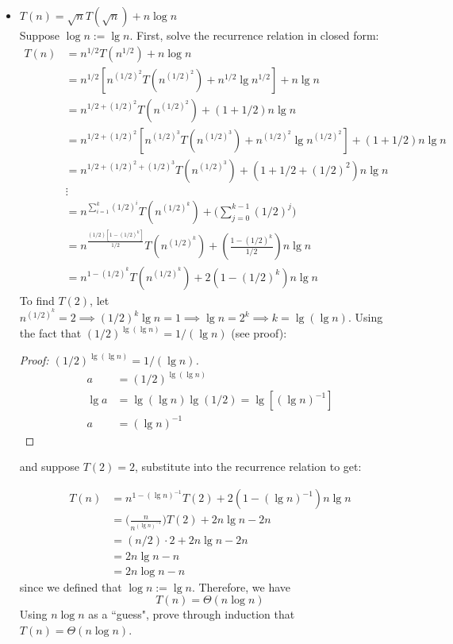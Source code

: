 \documentclass{article}
\begin{document}
\begin{itemize}
	\item $T(n)=\sqrt{n}T(\sqrt{n})+n\log n$ \\
	Suppose $\log n := \lg n$. First, solve the recurrence relation in closed form:
	\begin{align*}
	T(n)&=n^{1/2}T(n^{1/2})+n\log n \\
	&=n^{1/2}[n^{(1/2)^2}T(n^{(1/2)^2})+n^{1/2}\lg n^{1/2}] + n\lg n \\
	&=n^{1/2 + (1/2)^2}T(n^{(1/2)^2})+(1+1/2)n\lg n\\
	&=n^{1/2 + (1/2)^2} [n^{(1/2)^3}T(n^{(1/2)^3})+n^{(1/2)^2}\lg n^{(1/2)^2}]   +(1+1/2)n\lg n\\
	&=n^{1/2+(1/2)^2+(1/2)^3}T(n^{(1/2)^3})+(1+1/2+(1/2)^2)n\lg n \\
	&\vdots \\
	&=n^{\sum_{i=1}^{k}(1/2)^i}T(n^{(1/2)^k}) + \Big(\sum_{j=0}^{k-1} (1/2)^j\Big)\\
	&=n^\frac{(1/2)[1-(1/2)^k]}{1/2}T(n^{(1/2)^k})+(\frac{1-(1/2)^k}{1/2})n\lg n \\
	&=n^{1-(1/2)^k}T(n^{(1/2)^k})+2(1-(1/2)^k)n\lg n
	\end{align*}
	To find $T(2)$, let $n^{(1/2)^k}=2 \implies (1/2)^k \lg n = 1 \implies \lg n = 2^k \implies k = \lg(\lg n)$. Using the fact that $(1/2)^{\lg(\lg n)} = 1/(\lg n)$ (see proof):
	\begin{mdframed}
	\begin{proof}[Proof: $(1/2)^{\lg(\lg n)} = 1/(\lg n)$]
	\begin{align*}
	a &= (1/2)^{\lg(\lg n)} \\
	\lg a &= \lg (\lg n) \lg (1/2) = \lg [(\lg n)^{-1}]\\
	a &= (\lg n)^{-1}
	\end{align*}
	\end{proof}
	\end{mdframed}
	
	and suppose $T(2)=2$, substitute into the recurrence relation to get:
	
	\begin{align*}
	T(n) &= n^{1-(\lg n)^{-1}}T(2) + 2(1-(\lg n)^{-1})n \lg n \\
	& = \Big(\frac{n}{n^{(\lg n)^{-1}}}\Big)T(2)+2n\lg n - 2n \\
	& = (n/2)\cdot 2 + 2n \lg n-2n \\
	&= 2n\lg n - n \\
	&= 2n\log n - n
	\end{align*}
	since we defined that $\log n := \lg n$. Therefore, we have
	$$T(n)=\Theta(n \log n)$$
	Using $n\log n$ as a ``guess", prove through induction that $T(n)=\Theta(n \log n)$.
	

\end{itemize}
\end{document}
